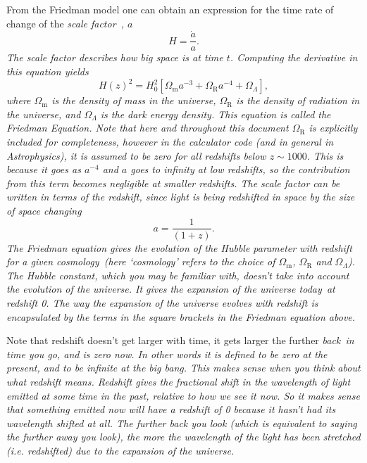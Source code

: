 \documentclass[]{article}
\begin{document}
\noindent From the Friedman model one can obtain an expression for the time rate of change of the \itshape scale factor~\upshape, $a$
\begin{equation}
H = \frac{\dot a}{a}.
\end{equation}
The scale factor describes how big space is at time $t$. Computing the derivative in this equation yields
\begin{equation}
H(z)^2 = H_0^2[\Omega_\mathrm{m} a^{-3}+\Omega_\mathrm{R} a^{-4}+\Omega_\Lambda],
\end{equation}
\noindent where $\Omega_\mathrm{m}$ is the density of mass in the universe, $\Omega_\mathrm{R}$ is the density of radiation in the universe, and $\Omega_\Lambda$ is the dark energy density. This equation is called the Friedman Equation. Note that here and throughout this document $\Omega_\mathrm{R}$ is explicitly included for completeness, however in the calculator code (and in general in Astrophysics), it is assumed to be zero for all redshifts below $z\sim1000$. This is because it goes as $a^{-4}$ and $a$ goes to infinity at low redshifts, so the contribution from this term becomes negligible at smaller redshifts. The scale factor can be written in terms of the redshift, since light is being redshifted in space by the size of space changing
\begin{equation}
a = \frac{1}{(1+z)}.
\end{equation}
The Friedman equation gives the evolution of the Hubble parameter with redshift for a given \itshape cosmology~\upshape (here ‘cosmology’ refers to the choice of $\Omega_\mathrm{m}$, $\Omega_\mathrm{R}$ and $\Omega_\Lambda$). The Hubble \itshape constant\upshape , which you may be familiar with, doesn't take into account the evolution of the universe. It gives the expansion of the universe \itshape today~\upshape at redshift 0. The way the expansion of the universe evolves with redshift is encapsulated by the terms in the square brackets in the Friedman equation above. 

\noindent Note that redshift doesn't get larger with time, it gets larger the further \itshape back~\upshape in time you go, and is zero now. In other words it is defined to be zero at the present, and to be infinite at the big bang. This makes sense when you think about what redshift means. Redshift gives the fractional shift in the wavelength of light emitted at some time in the past, relative to how we see it now. So it makes sense that something emitted now will have a redshift of 0 because it hasn't had its wavelength shifted at all. The further back you look (which is equivalent to saying the further away you look), the more the wavelength of the light has been stretched (i.e. redshifted) due to the expansion of the universe. \\
\end{document}
